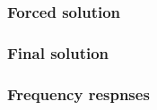 

\subsubsection{Forced solution}  %

\subsubsection{Final solution}  %

\subsubsection{Frequency respnses}  %

\lipsum[1-1]



